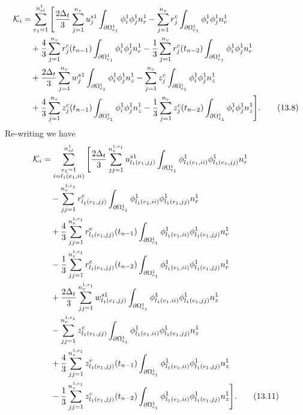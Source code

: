 \documentclass{article}
\begin{document}
\begin{align}
\mathcal{K}_i &= \sum_{e_1=1}^{n_{el}^1} \Bigg[ \frac{2\Delta_t}{3} \sum_{j=1}^{n_v} u_j^{s1} \int_{\partial \Omega_{e_1}^1} \phi_i^1 \phi_j^1 n_r^1 - \sum_{j=1}^{n_v} r_j^c \int_{\partial \Omega_{e_1}^1} \phi_i^1 \phi_j^1 n_r^1 \nonumber\\
&\quad + \frac{4}{3} \sum_{j=1}^{n_v} r_j^c(t_{n-1}) \int_{\partial \Omega_{e_1}^1} \phi_i^1 \phi_j^1 n_r^1 - \frac{1}{3} \sum_{j=1}^{n_v} r_j^c(t_{n-2}) \int_{\partial \Omega_{e_1}^1} \phi_i^1 \phi_j^1 n_r^1 \nonumber\\
&\quad + \frac{2\Delta_t}{3} \sum_{j=1}^{n_v} w_j^{s1} \int_{\partial \Omega_{e_1}^1} \phi_i^1 \phi_j^1 n_z^1 - \sum_{j=1}^{n_v} z_j^c \int_{\partial \Omega_{e_1}^1} \phi_i^1 \phi_j^1 n_z^1 \nonumber\\
&\quad + \frac{4}{3} \sum_{j=1}^{n_v} z_j^c(t_{n-1}) \int_{\partial \Omega_{e_1}^1} \phi_i^1 \phi_j^1 n_z^1 - \frac{1}{3} \sum_{j=1}^{n_v} z_j^c(t_{n-2}) \int_{\partial \Omega_{e_1}^1} \phi_i^1 \phi_j^1 n_z^1 \Bigg]. \tag{13.8}
\end{align}
Re-writing we have
\begin{align}
\mathcal{K}_i &= \sum_{\substack{e_1=1\\ i=l_1(e_1,ii)}}^{n_{el}^1} \Bigg[ \frac{2\Delta_t}{3} \sum_{jj=1}^{n_v^{1,e_1}} u_{l_1(e_1,jj)}^{s1} \int_{\partial \Omega_{e_1}^1} \phi_{l_1(e_1,ii)}^1 \phi_{l_1(e_1,jj)}^1 n_r^1 \nonumber\\
&\quad - \sum_{jj=1}^{n_v^{1,e_1}} r_{l_1(e_1,jj)}^c \int_{\partial \Omega_{e_1}^1} \phi_{l_1(e_1,ii)}^1 \phi_{l_1(e_1,jj)}^1 n_r^1 \nonumber\\
&\quad + \frac{4}{3} \sum_{jj=1}^{n_v^{1,e_1}} r_{l_1(e_1,jj)}^c(t_{n-1}) \int_{\partial \Omega_{e_1}^1} \phi_{l_1(e_1,ii)}^1 \phi_{l_1(e_1,jj)}^1 n_r^1 \nonumber\\
&\quad - \frac{1}{3} \sum_{jj=1}^{n_v^{1,e_1}} r_{l_1(e_1,jj)}^c(t_{n-2}) \int_{\partial \Omega_{e_1}^1} \phi_{l_1(e_1,ii)}^1 \phi_{l_1(e_1,jj)}^1 n_r^1 \nonumber\\
&\quad + \frac{2\Delta_t}{3} \sum_{jj=1}^{n_v^{1,e_1}} w_{l_1(e_1,jj)}^{s1} \int_{\partial \Omega_{e_1}^1} \phi_{l_1(e_1,ii)}^1 \phi_{l_1(e_1,jj)}^1 n_z^1 \nonumber\\
&\quad - \sum_{jj=1}^{n_v^{1,e_1}} z_{l_1(e_1,jj)}^c \int_{\partial \Omega_{e_1}^1} \phi_{l_1(e_1,ii)}^1 \phi_{l_1(e_1,jj)}^1 n_z^1 \nonumber\\
&\quad + \frac{4}{3} \sum_{jj=1}^{n_v^{1,e_1}} z_{l_1(e_1,jj)}^c(t_{n-1}) \int_{\partial \Omega_{e_1}^1} \phi_{l_1(e_1,ii)}^1 \phi_{l_1(e_1,jj)}^1 n_z^1 \nonumber\\
&\quad - \frac{1}{3} \sum_{jj=1}^{n_v^{1,e_1}} z_{l_1(e_1,jj)}^c(t_{n-2}) \int_{\partial \Omega_{e_1}^1} \phi_{l_1(e_1,ii)}^1 \phi_{l_1(e_1,jj)}^1 n_z^1 \Bigg]. \tag{13.11}
\end{align}
\end{document}

